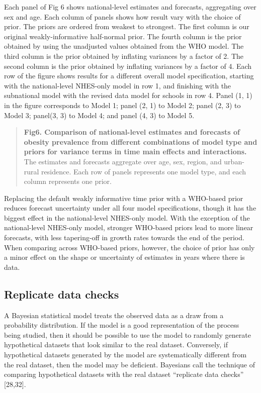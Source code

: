 \documentclass[10pt,letterpaper]{article}
\begin{document}
Each panel of Fig 6 shows national-level estimates and forecasts,
aggregating over sex and age. Each column of panels shows how result
vary with the choice of prior. The priors are ordered from weakest to
strongest. The first column is our original weakly-informative
half-normal prior. The fourth column is the prior obtained by using the
unadjusted values obtained from the WHO model. The third column is the
prior obtained by inflating variances by a factor of 2. The second
column is the prior obtained by inflating variances by a factor of 4.
Each row of the figure shows results for a different overall model
specification, starting with the national-level NHES-only model in row
1, and finishing with the subnational model with the revised data model
for schools in row 4. Panel (1, 1) in the figure corresponds to Model 1;
panel (2, 1) to Model 2; panel (2, 3) to Model 3; panel(3, 3) to Model
4; and panel (4, 3) to Model 5.

\begin{quote}
\textbf{Fig6. Comparison of national-level estimates and forecasts of obesity prevalence from different combinations of model type and priors for variance terms in time main effects and interactions.} The estimates and forecasts aggregate over age, sex, region, and urban-rural residence. Each row of panels represents one model type, and each column represents one prior.
\end{quote}

Replacing the default weakly informative time prior with a WHO-based
prior reduces forecast uncertainty under all four model specifications,
though it has the biggest effect in the national-level NHES-only model.
With the exception of the national-level NHES-only model, stronger
WHO-based priors lead to more linear forecasts, with less tapering-off
in growth rates towards the end of the period. When comparing across
WHO-based priors, however, the choice of prior has only a minor effect
on the shape or uncertainty of estimates in years where there is data.

\hypertarget{replicate-data-checks}{%
\subsection{Replicate data checks}\label{replicate-data-checks}}

A Bayesian statistical model treats the observed data as a draw from a
probability distribution. If the model is a good representation of the
process being studied, then it should be possible to use the model to
randomly generate hypothetical datasets that look similar to the real
dataset. Conversely, if hypothetical datasets generated by the model are
systematically different from the real dataset, then the model may be
deficient. Bayesians call the technique of comparing hypothetical
datasets with the real dataset ``replicate data checks'' {[}28,32{]}.
\end{document}
